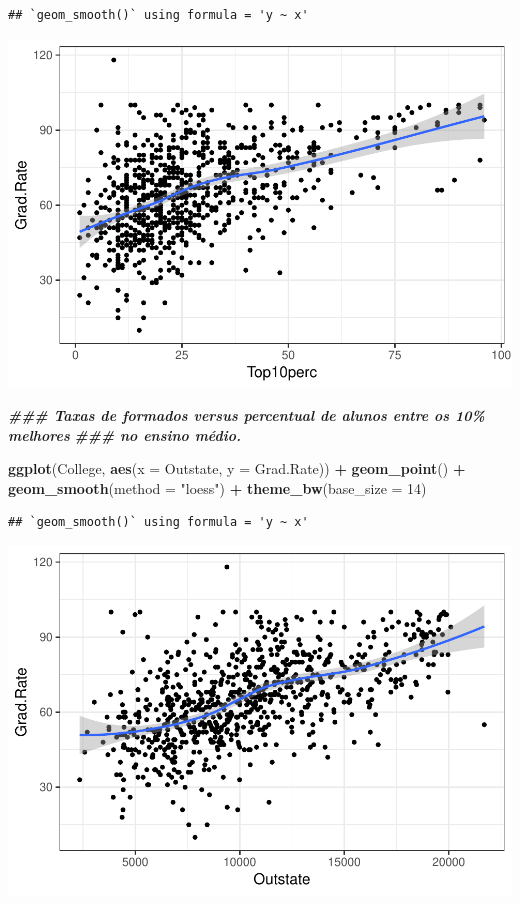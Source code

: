 \documentclass[
]{article}
\newenvironment{Shaded}{\begin{snugshade}}{\end{snugshade}}
\newcommand{\AttributeTok}[1]{\textcolor[rgb]{0.13,0.29,0.53}{#1}}
\newcommand{\DecValTok}[1]{\textcolor[rgb]{0.00,0.00,0.81}{#1}}
\newcommand{\DocumentationTok}[1]{\textcolor[rgb]{0.56,0.35,0.01}{\textbf{\textit{#1}}}}
\newcommand{\FunctionTok}[1]{\textcolor[rgb]{0.13,0.29,0.53}{\textbf{#1}}}
\newcommand{\NormalTok}[1]{#1}
\newcommand{\SpecialCharTok}[1]{\textcolor[rgb]{0.81,0.36,0.00}{\textbf{#1}}}
\newcommand{\StringTok}[1]{\textcolor[rgb]{0.31,0.60,0.02}{#1}}
\begin{document}
\begin{verbatim}
## `geom_smooth()` using formula = 'y ~ x'
\end{verbatim}

\includegraphics{Modelos_Estatisticos-2024-08-10_files/figure-latex/unnamed-chunk-6-2.pdf}

\begin{Shaded}
\begin{Highlighting}[]
\DocumentationTok{\#\#\# Taxas de formados versus percentual de alunos entre os 10\% melhores}
\DocumentationTok{\#\#\# no ensino médio.}

\FunctionTok{ggplot}\NormalTok{(College, }\FunctionTok{aes}\NormalTok{(}\AttributeTok{x =}\NormalTok{ Outstate, }\AttributeTok{y =}\NormalTok{ Grad.Rate)) }\SpecialCharTok{+} \FunctionTok{geom\_point}\NormalTok{() }\SpecialCharTok{+}
    \FunctionTok{geom\_smooth}\NormalTok{(}\AttributeTok{method =} \StringTok{"loess"}\NormalTok{) }\SpecialCharTok{+} 
    \FunctionTok{theme\_bw}\NormalTok{(}\AttributeTok{base\_size =} \DecValTok{14}\NormalTok{)}
\end{Highlighting}
\end{Shaded}

\begin{verbatim}
## `geom_smooth()` using formula = 'y ~ x'
\end{verbatim}

\includegraphics{Modelos_Estatisticos-2024-08-10_files/figure-latex/unnamed-chunk-6-3.pdf}
\end{document}
